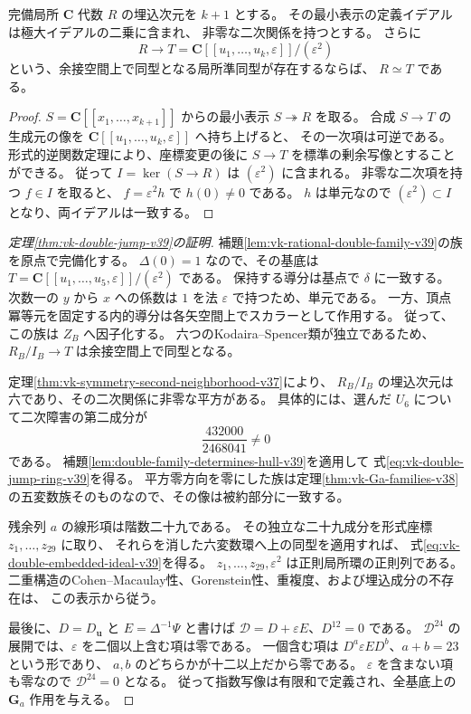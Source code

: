 \begin{lemma}[平方零族と非零平方関係による判定]
\label{lem:double-family-determines-hull-v39}
完備局所 $\mathbf C$ 代数 $R$ の埋込次元を $k+1$ とする。
その最小表示の定義イデアルは極大イデアルの二乗に含まれ、
非零な二次関係を持つとする。
さらに
\[
 R\longrightarrow
 T=\mathbf C[[u_1,\ldots,u_k,\varepsilon]]/(\varepsilon^2)
\]
という、余接空間上で同型となる局所準同型が存在するならば、
$R\simeq T$ である。
\end{lemma}

\begin{proof}
$S=\mathbf C[[x_1,\ldots,x_{k+1}]]$ からの最小表示 $S\twoheadrightarrow R$ を取る。
合成 $S\to T$ の生成元の像を $\mathbf C[[u_1,\ldots,u_k,\varepsilon]]$ へ持ち上げると、
その一次項は可逆である。形式的逆関数定理により、座標変更の後に
$S\to T$ を標準の剰余写像とすることができる。
従って $I=\ker(S\to R)$ は $(\varepsilon^2)$ に含まれる。
非零な二次項を持つ $f\in I$ を取ると、
$f=\varepsilon^2h$ で $h(0)\ne0$ である。
$h$ は単元なので $(\varepsilon^2)\subset I$ となり、両イデアルは一致する。
\end{proof}

\begin{proof}[定理\ref{thm:vk-double-jump-v39}の証明]
補題\ref{lem:vk-rational-double-family-v39}の族を原点で完備化する。
$\Delta(0)=1$ なので、その基底は
$T=\mathbf C[[u_1,\ldots,u_5,\varepsilon]]/(\varepsilon^2)$ である。
保持する導分は基点で $\delta$ に一致する。
次数一の $y$ から $x$ への係数は $1$ を法 $\varepsilon$ で持つため、単元である。
一方、頂点冪等元を固定する内的導分は各矢空間上でスカラーとして作用する。
従って、この族は $Z_B$ へ因子化する。
六つのKodaira--Spencer類が独立であるため、
$R_B/I_B\to T$ は余接空間上で同型となる。

定理\ref{thm:vk-symmetry-second-neighborhood-v37}により、
$R_B/I_B$ の埋込次元は六であり、その二次関係に非零な平方がある。
具体的には、選んだ $U_6$ について二次障害の第二成分が
\[
 \frac{432000}{2468041}\ne0
\]
である。
補題\ref{lem:double-family-determines-hull-v39}を適用して
式\eqref{eq:vk-double-jump-ring-v39}を得る。
平方零方向を零にした族は定理\ref{thm:vk-Ga-families-v38}の五変数族そのものなので、その像は被約部分に一致する。

残余列 $a$ の線形項は階数二十九である。
その独立な二十九成分を形式座標 $z_1,\ldots,z_{29}$ に取り、
それらを消した六変数環へ上の同型を適用すれば、
式\eqref{eq:vk-double-embedded-ideal-v39}を得る。
$z_1,\ldots,z_{29},\varepsilon^2$ は正則局所環の正則列である。
二重構造のCohen--Macaulay性、Gorenstein性、重複度、および埋込成分の不存在は、
この表示から従う。

最後に、$D=D_{\boldsymbol u}$ と $E=\Delta^{-1}\Psi$ と書けば
$\mathcal D=D+\varepsilon E$、$D^{12}=0$ である。
$\mathcal D^{24}$ の展開では、$\varepsilon$ を二個以上含む項は零である。
一個含む項は $D^a\varepsilon E D^b$、$a+b=23$ という形であり、
$a,b$ のどちらかが十二以上だから零である。
$\varepsilon$ を含まない項も零なので $\mathcal D^{24}=0$ となる。
従って指数写像は有限和で定義され、全基底上の $\mathbf G_a$ 作用を与える。
\end{proof}

